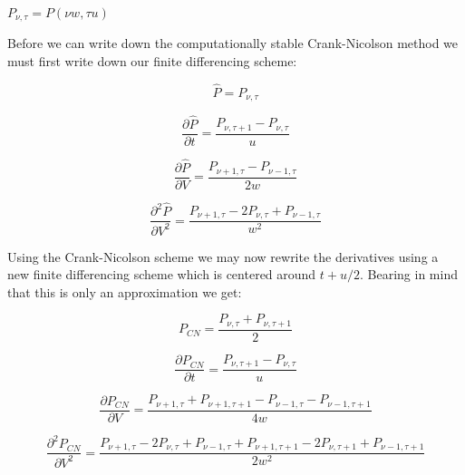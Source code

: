 \documentclass[10pt]{article}
\begin{document}
$P_{\nu,\tau} = P(\nu w,\tau u)$

Before we can write down the computationally stable Crank-Nicolson
method we must first write down our finite differencing scheme:

\begin{equation}
    \hat{P} = P_{\nu,\tau}
\end{equation}

\begin{equation}
    \frac{\partial \hat{P}}{\partial t} = \frac{P_{\nu,\tau +1 } -
    P_{\nu,\tau}}{u}
\end{equation}

\begin{equation}
    \frac{\partial \hat{P}}{\partial V} = 
    \frac{P_{\nu +1,\tau } -
    P_{\nu - 1,\tau } }
    {2w}
\end{equation}

\begin{equation}
    \frac{\partial^2 \hat{P}}{\partial V^2} = 
    \frac{P_{\nu+1,\tau} - 2 P_{\nu,\tau} + P_{\nu-1,\tau}}
    {w^2}
\end{equation}


Using the Crank-Nicolson scheme we  may now rewrite the derivatives
using a new finite differencing scheme which is centered around $t +
u/2$. Bearing in mind that this is only
an approximation we get:


\begin{equation}
    P_{CN} = \frac{P_{\nu,\tau} + P_{\nu,\tau + 1}}{2}
\end{equation}

\begin{equation}
    \frac{\partial P_{CN}}{\partial t} = \frac{P_{\nu,\tau +1 } -
    P_{\nu,\tau}}{u}
\end{equation}

\begin{equation}
    \frac{\partial P_{CN}}{\partial V} = 
    \frac{P_{\nu +1,\tau } + P_{\nu +1,\tau +1 } -
    P_{\nu - 1,\tau } - P_{\nu -1,\tau +1}} 
    {4w}
\end{equation}

\begin{equation}
    \frac{\partial^2 P_{CN}}{\partial V^2} = 
    \frac{P_{\nu+1,\tau} - 2 P_{\nu,\tau} + P_{\nu-1,\tau} +
    P_{\nu+1,\tau+1} - 2 P_{\nu,\tau+1} + P_{\nu-1,\tau+1}}
    {2w^2}
\end{equation}
\end{document}

